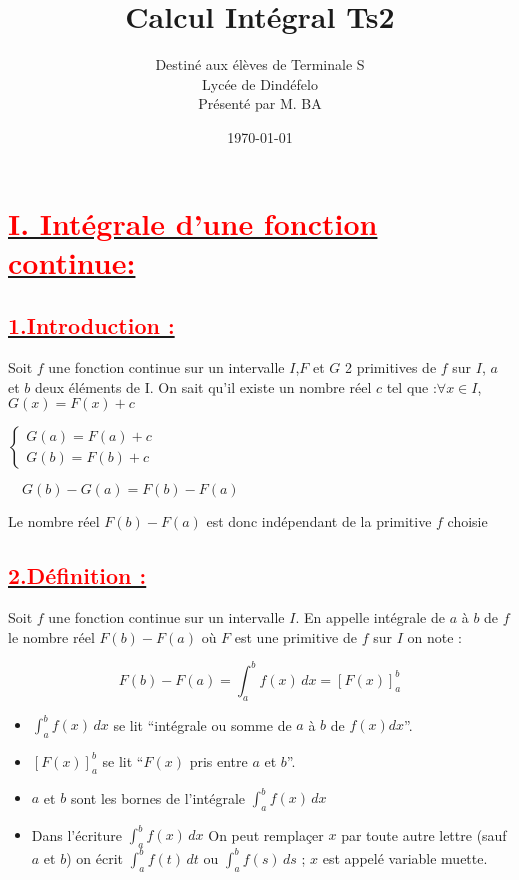 \documentclass[12pt]{article}
\author{Destiné aux élèves de Terminale S\\Lycée de Dindéfelo\\Présenté par M. BA}
\title{\textbf{Calcul Intégral Ts2}}
\date{\today}
\begin{document}
\maketitle
\newpage

\section*{\underline{\textbf{\textcolor{red}{I. Intégrale d'une fonction continue: }}}}
\subsection*{\underline{\textbf{\textcolor{red}{1.Introduction :}}}}

Soit \( f \) une fonction continue sur un intervalle \( I \),\( F \) et \( G \) 2 primitives de \( f \) sur \( I \), \( a \) et \( b  \) deux éléments de I. On sait qu'il existe un nombre réel $c$ tel que :$\forall x\in I$, 
 \( G(x) = F(x) + c \)

\underline{\( 
\begin{cases}
G(a) = F(a) + c\\
G(b) = F(b) + c
\end{cases}
\)}

\(
\quad G(b) - G(a) = F(b) - F(a)
\)

Le nombre réel \( F(b) - F(a) \) est donc indépendant de la primitive \( f \) choisie

\subsection*{\underline{\textbf{\textcolor{red}{2.Définition :}}}}

Soit \( f \) une fonction continue sur un intervalle \( I \).
En appelle intégrale de \( a \) à \( b \) de \( f \) le nombre réel \( F(b) - F(a) \) où \( F \) est une primitive de \( f \) sur \( I \) on note :

\[
F(b) - F(a) = \int_{a}^{b} f(x) \, dx = \left[ F(x) \right]_{a}^{b}
\]

\begin{itemize}
    \item \( \int_a^b f(x) \, dx \) se lit ``intégrale ou somme  de $a$ à $b$ de $f(x)dx$''.
    \item \( \left[ F(x) \right]_a^b \) se lit ``\( F(x) \) pris entre \( a \) et \( b \)''.
    \item \( a \) et \( b \) sont les bornes de l'intégrale \( \int_a^b f(x) \, dx \)
        \item Dans l'écriture \( \int_a^b f(x) \, dx \) On peut remplaçer \( x \) par toute autre lettre (sauf \( a \) et \( b \)) on écrit \( \int_a^b f(t) \, dt \) ou \( \int_a^b f(s) \, ds \) ; \( x \) est appelé variable muette.
\end{itemize}
\newpage
\end{document}
